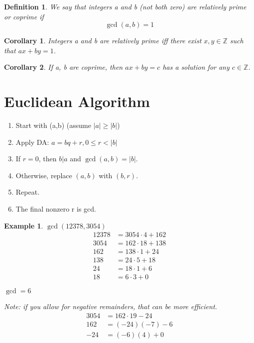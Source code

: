 \documentclass[letterpaper]{article}
\newtheorem{corollary}{Corollary}[section]
\newtheorem{definition}{Definition}[section]
\newtheorem{example}{Example}[theorem]
\begin{document}
    \begin{definition}
        We say that integers a and b (not both zero) are relatively prime or coprime if
        \[
            \gcd(a,b) = 1
        \]
    \end{definition}
    \begin{corollary}
        Integers a and b are relatively prime iff there exist $x,y\in\mathbb{Z}$ such that
        $ax+by=1$.
    \end{corollary}
    \begin{corollary}
        If a, b are coprime, then $ax+by=c$ has a solution for any $c\in\mathbb{Z}$.
    \end{corollary}

\section{Euclidean Algorithm}
    \begin{enumerate}
        \item Start with (a,b) (assume $|a|\geq |b|$)
        \item Apply DA: $a = bq+r, 0 \leq r < |b|$
        \item If $r=0$, then $b|a$ and $\gcd(a,b) = |b|$.
        \item Otherwise, replace $(a,b)$ with $(b,r)$.
        \item Repeat.
        \item The final nonzero r is gcd.
    \end{enumerate}
    \begin{example}
        $\gcd(12378,3054)$
        \begin{align*}
            12378 & = 3054\cdot 4 + 162 \\
            3054 & = 162\cdot 18 + 138 \\
            162 & = 138\cdot 1 + 24 \\
            138 & = 24\cdot 5 + 18 \\
            24 & = 18\cdot 1 + 6 \\
            18 & = 6\cdot 3 + 0 
        \end{align*}
        \begin{center}
            $\gcd = 6$
        \end{center}
        Note: if you allow for negative remainders, that can be more efficient.
        \begin{align*}
            3054 & = 162\cdot 19 - 24 \\
            162 & = (-24)(-7) - 6 \\
            -24 & = (-6)(4) + 0
        \end{align*}
    \end{example}
\end{document}
